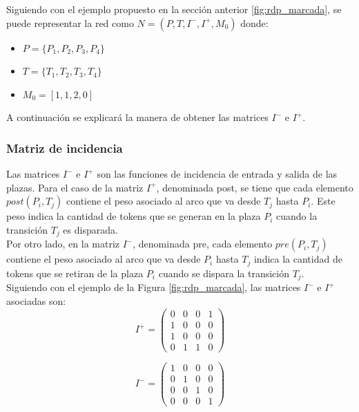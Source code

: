 Siguiendo con el ejemplo propuesto en la sección anterior \ref{fig:rdp_marcada}, se puede representar la red como $N = (P, T, I^-, I^+, M_0)$ donde:

\begin{itemize}
    \item $P = \{P_1, P_2, P_3, P_4\}$
    \item $T = \{T_1, T_2, T_3, T_4\}$
    \item $M_0 = [1, 1, 2, 0]$
\end{itemize}

A continuación se explicará la manera de obtener las matrices $I^-$ e $I^+$.

\subsubsection{Matriz de incidencia}
Las matrices $I^-$ e $I^+$ son las funciones de incidencia de entrada y salida de las plazas. Para el caso de la matriz $I^+$, denominada post, se tiene que cada elemento $post(P_i, T_j)$ contiene el peso asociado al arco que va desde $T_j$ hasta $P_i$. Este peso indica la cantidad de tokens que se generan en la plaza $P_i$ cuando la transición $T_j$ es disparada.\\

Por otro lado, en la matriz $I^-$, denominada pre, cada elemento $pre(P_i, T_j)$ contiene el peso asociado al arco que va desde $P_i$ hasta $T_j$ indica la cantidad de tokens que se retiran de la plaza $P_i$ cuando se dispara la transición $T_j$.\\

Siguiendo con el ejemplo de la Figura \ref{fig:rdp_marcada}, las matrices $I^-$ e $I^+$ asociadas son:
\begin{equation}
I^+ =
    \begin{pmatrix}
        0 & 0 & 0 & 1\\
        1 & 0 & 0 & 0\\
        1 & 0 & 0 & 0\\
        0 & 1 & 1 & 0
    \end{pmatrix}
\end{equation}
    
\begin{equation}
I^- =
    \begin{pmatrix}
        1 & 0 & 0 & 0\\
        0 & 1 & 0 & 0\\
        0 & 0 & 1 & 0\\
        0 & 0 & 0 & 1
    \end{pmatrix}
\end{equation}

